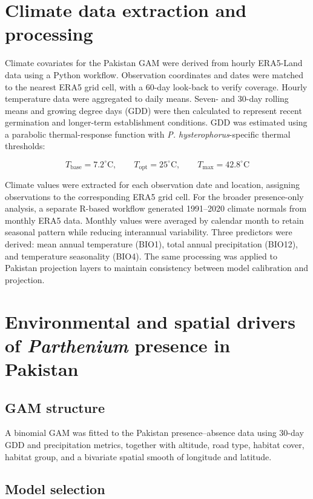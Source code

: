 \section{Climate data extraction and processing}

Climate covariates for the Pakistan GAM were derived from hourly ERA5-Land data using a Python workflow. Observation coordinates and dates were matched to the nearest ERA5 grid cell, with a 60-day look-back to verify coverage. Hourly temperature data were aggregated to daily means. Seven- and 30-day rolling means and growing degree days (GDD) were then calculated to represent recent germination and longer-term establishment conditions. GDD was estimated using a parabolic thermal-response function with \textit{P. hysterophorus}-specific thermal thresholds:

$$
T_{\mathrm{base}} = 7.2^{\circ}\mathrm{C}, \qquad T_{\mathrm{opt}} = 25^{\circ}\mathrm{C}, \qquad T_{\mathrm{max}} = 42.8^{\circ}\mathrm{C}
$$

Climate values were extracted for each observation date and location, assigning observations to the corresponding ERA5 grid cell. For the broader presence-only analysis, a separate R-based workflow generated 1991--2020 climate normals from monthly ERA5 data. Monthly values were averaged by calendar month to retain seasonal pattern while reducing interannual variability. Three predictors were derived: mean annual temperature (BIO1), total annual precipitation (BIO12), and temperature seasonality (BIO4). The same processing was applied to Pakistan projection layers to maintain consistency between model calibration and projection.

\section{Environmental and spatial drivers of \textit{Parthenium} presence in Pakistan}

\subsection{GAM structure}

A binomial GAM was fitted to the Pakistan presence--absence data using 30-day GDD and precipitation metrics, together with altitude, road type, habitat cover, habitat group, and a bivariate spatial smooth of longitude and latitude.

\subsection{Model selection}

